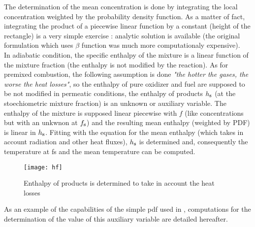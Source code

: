 The determination of the mean concentration is done by integrating the local
concentration weighted by the probability density function. As a matter of fact,
integrating the product of a piecewise linear function by a constant (height of
the rectangle) is a very simple exercise : analytic
solution is available (the original formulation \cite{2} which uses $\beta$ function was much more computationaly expensive).\\
In adiabatic condition, the specific enthalpy of the mixture is a linear
function of the mixture fraction (the enthalpy is not modified by the
reaction). As for premixed combustion, the following assumption is done
\textit{"the hotter the gases, the worse the heat losses"}, so the enthalpy of
pure oxidizer and fuel are supposed to be not modified in permeatic conditions,
the enthalpy of products $h_{\mbox{\footnotesize s}}$ (at the stoechiometric
mixture fraction) is an unknown or auxiliary variable. The enthalpy of the
mixture is supposed linear piecewise with $f$ (like concentrations but with an
unkwnon at $f_{\mbox{\footnotesize s}}$) and the resulting mean enthalpy
(weighted by PDF) is linear in $h_{\mbox{\footnotesize s}}$.  Fitting with the
equation for the mean enthalpy (which takes in account radiation and other heat
fluxes), $h_{\mbox{\footnotesize s}}$ is determined and, consequently the
temperature at fs and the mean temperature can be computed.
 
\begin{figure}[h]
\centerline{\texttt{[image: hf]}}
\caption{Enthalpy of products is determined to take in account the heat losses }
\end{figure}
As an example of the capabilities of the simple pdf used in \CS, computations
for the determination of the value of this auxiliary variable are detailed
hereafter.

